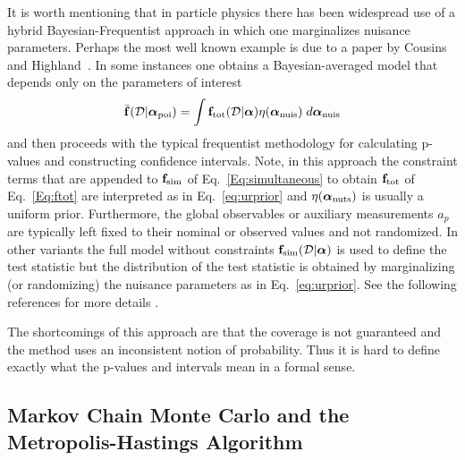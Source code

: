 \documentclass{cernrep}
\def\vec#1{\ifmmode
\mathchoice{\mbox{\boldmath$\displaystyle\bf#1$}}
{\mbox{\boldmath$\textstyle\bf#1$}}
{\mbox{\boldmath$\scriptstyle\bf#1$}}
{\mbox{\boldmath$\scriptscriptstyle\bf#1$}}\else
{\mbox{\boldmath$\bf#1$}}\fi}
\newcommand{\data}{{\ensuremath{\mathcal{D}}}}
\newcommand{\F}{{\ensuremath{\mathbf{f}}}}
\begin{document}
It is worth mentioning that in particle physics there has been widespread use of a hybrid Bayesian-Frequentist approach in which one marginalizes nuisance parameters.  Perhaps the most well known example is due to a paper by Cousins and Highland~\cite{CousinsHighland:1991qz}.  In some instances one obtains a Bayesian-averaged model that depends only on the parameters of interest
\begin{equation}
\bar{\F}(\data | \vec\alpha_{\rm poi}) = \int  \F_{\rm tot}(\data | \vec\alpha) \eta(\vec\alpha_{\rm nuis}) \; d\vec\alpha_{\rm nuis}
\end{equation}
and then proceeds with the typical frequentist methodology for calculating p-values and constructing confidence intervals. Note, in this approach the constraint terms that are appended to $\F_{\rm sim}$ of Eq.~\ref{Eq:simultaneous} to obtain $\F_{\rm tot}$ of Eq.~\ref{Eq:ftot} are interpreted as in Eq.~\ref{eq:urprior} and $\eta(\vec\alpha_{\rm nuts})$ is usually a uniform prior.  Furthermore, the global observables or auxiliary measurements $a_p$ are typically left fixed to their nominal or observed values and not randomized.
  In other variants the full model without constraints $\F_{\rm sim}(\data | \vec\alpha)$ is used to define the test statistic but the distribution of the test statistic is obtained by marginalizing (or randomizing) the nuisance parameters as in Eq.~\ref{eq:urprior}.  See the following references for more details  \cite{Conrad:2005zm,Tegenfeldt:2004dk,Conrad:2002ur,Conrad:2002kn,Rolke:2004mj,PhysRevD.67.118101,Demortier:2007zz,Cousins:2008zz}.  
  
The shortcomings of this approach are that the coverage is not guaranteed and the method uses an inconsistent notion of probability.  Thus it is hard to define exactly what the p-values and intervals mean in a formal sense.


\subsection{Markov Chain Monte Carlo and the Metropolis-Hastings Algorithm}
\end{document}
